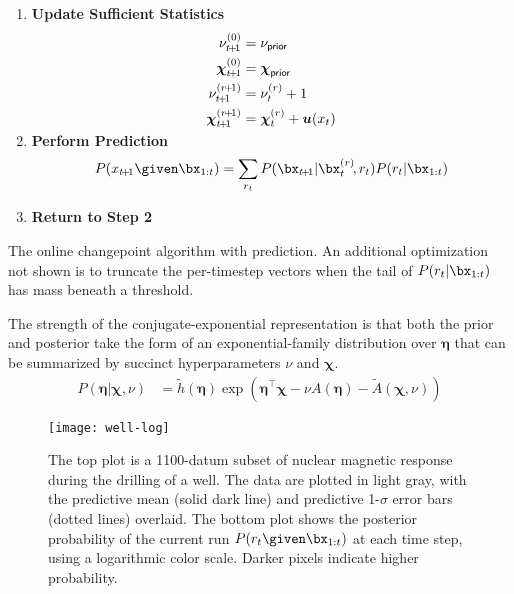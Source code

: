 \documentclass[]{article}
\newcommand{\boldeta}{\ensuremath{\boldsymbol{\eta}}}
\newcommand{\bchi}{\ensuremath{\boldsymbol{\chi}}}
\begin{document}
\begin{algorithm}[t]
{\begin{minipage}[t]{3.2in}
\begin{enumerate}[itemsep=0cm]
\begin{equation*}
	   P(\bx_{1:t})\\[-0.2cm]
	  \end{equation*}
	\item \textbf{Update Sufficient Statistics}
	  \vskip -0.8cm
	  \begin{equation*}
	    \begin{split}
	    \nu_{t\!+\!1}^{(0)} &= \nu_{\sf{prior}}\\
	    \bchi_{t\!+\!1}^{(0)} &= \bchi_{\sf{prior}}\\
	    \nu_{t\!+\!1}^{(r\!+\!1)} &= \nu_{t}^{(r)} + 1\\
	    \bchi_{t\!+\!1}^{(r\!+\!1)} &= \bchi_{t}^{(r)} +
	    \boldsymbol{u}(x_{t})\\[-0.3cm]
	    \end{split}
	  \end{equation*}
	\item \textbf{Perform Prediction}
	  \vskip -0.8cm
	  \begin{equation*}
	    P(x_{t\!+\!1}\given\bx_{1:t}) =
	    \sum_{r_{t}}P(\bx_{t\!+\!1}|
	                      \bx_{t}^{(r)}\!,r_{t})
		              P(r_{t}|\bx_{1:t})\\[-0.4cm]
	  \end{equation*}
	\item \textbf{Return to Step 2}
      \end{enumerate}
      \end{minipage}}
      \caption{The online changepoint algorithm with prediction.  An
      additional optimization not shown is to truncate the per-timestep
      vectors when the tail of $P(r_{t}|\bx_{1:t})$ has mass beneath a
      threshold.}
      \label{alg:update}
    \end{algorithm}
       
      The strength of the conjugate-exponential representation is that both
      the prior and posterior take the form of an exponential-family
      distribution over $\boldeta$ that can be summarized by succinct
      hyperparameters $\nu$ and $\bchi$.
      \begin{align}\label{eqn:exponential-posterior}
	P(\boldeta|\bchi,\nu) &= \tilde{h}(\boldeta)\exp\left(
        \boldeta^{\intercal}\bchi - \nu A(\boldeta) -
	\tilde{A}(\bchi,\nu)\right)
      \end{align}

      \begin{figure*}[t]
	\centering
	\texttt{[image: well-log]}
	\vskip -0.5cm
	\caption{The top plot is a 1100-datum subset of nuclear magnetic
	response during the drilling of a well.  The data are plotted in
	light gray, with the predictive mean (solid dark line) and
	predictive 1-$\sigma$ error bars (dotted lines) overlaid.  The
	bottom plot shows the posterior probability of the current run
	$P(r_{t}\given \bx_{1:t})$ at each time step, using a logarithmic
	color scale.  Darker pixels indicate higher probability.}
	\label{fig:well-log}
      \end{figure*}
 
\end{document}
